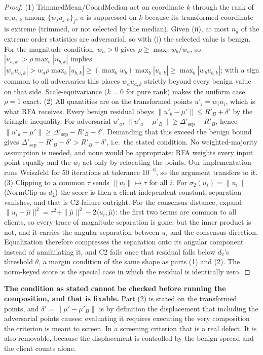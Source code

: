 \documentclass{article}
\begin{document}
\begin{proof}
(1) TrimmedMean/CoordMedian act on coordinate $k$ through the rank of $w_i u_{i,k}$ among $\{w_j u_{j,k}\}_j$; $a$ is suppressed on $k$ because its transformed coordinate is extreme (trimmed, or not selected by the median). Given (ii), at most $n_a$ of the extreme order statistics are adversarial, so with (i) the selected value is benign. For the magnitude condition, $w_a>0$ gives $\rho \ge \max_b w_b/w_a$, so $|u_{a,k}| > \rho\max_b|u_{b,k}|$ implies $|w_a u_{a,k}| > w_a\rho\max_b|u_{b,k}| \ge (\max_b w_b)\max_b|u_{b,k}| \ge \max_b|w_b u_{b,k}|$; with a sign common to all adversaries this places $w_a u_{a,k}$ strictly beyond every benign value on that side. Scale-equivariance ($k{=}0$ for pure rank) makes the uniform case $\rho{=}1$ exact.
(2) All quantities are on the transformed points $u'_i = w_i u_i$, which is what RFA receives. Every benign residual obeys $\|u'_b - \mu'\| \le R'_B + \delta'$ by the triangle inequality. For adversarial $u'_a$, $\|u'_a - \mu'_B\| \ge \Delta'_{\mathrm{sep}} - R'_B$, hence $\|u'_a - \mu'\| \ge \Delta'_{\mathrm{sep}} - R'_B - \delta'$. Demanding that this exceed the benign bound gives $\Delta'_{\mathrm{sep}} - R'_B - \delta' > R'_B + \delta'$, i.e.\ the stated condition. No weighted-majority assumption is needed, and none would be appropriate: RFA weights every input point equally and the $w_i$ act only by relocating the points. Our implementation runs Weiszfeld for 50 iterations at tolerance $10^{-6}$, so the argument transfers to it.
(3) Clipping to a common $\tau$ sends $\|u_i\|\mapsto\tau$ for all $i$. For $\sigma_2(u_i)=\|u_i\|$ (NormClip-as-$d_2$) the score is then a client-independent constant, separation vanishes, and that is C2-failure outright. For the consensus distance, expand $\|u_i-\hat\mu\|^2 = \tau^2 + \|\hat\mu\|^2 - 2\langle u_i,\hat\mu\rangle$: the first two terms are common to all clients, so every trace of magnitude separation is gone, but the inner product is not, and it carries the angular separation between $u_i$ and the consensus direction. Equalization therefore compresses the separation onto its angular component instead of annihilating it, and C2 fails once that residual falls below $d_2$'s threshold $\theta$, a margin condition of the same shape as parts (1) and (2). The norm-keyed score is the special case in which the residual is identically zero. \qedhere
\end{proof}

\noindent\textbf{The condition as stated cannot be checked before running the composition, and that is fixable.} Part (2) is stated on the transformed points, and $\delta' = \|\mu'-\mu'_B\|$ is by definition the displacement that including the adversarial points causes: evaluating it requires executing the very composition the criterion is meant to screen. In a screening criterion that is a real defect. It is also removable, because the displacement is controlled by the benign spread and the client counts alone.
\end{document}
